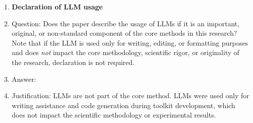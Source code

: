 \begin{enumerate}
\item {\bf Declaration of LLM usage}
    \item[] Question: Does the paper describe the usage of LLMs if it is an important, original, or non-standard component of the core methods in this research? Note that if the LLM is used only for writing, editing, or formatting purposes and does \emph{not} impact the core methodology, scientific rigor, or originality of the research, declaration is not required.
    \item[] Answer: \answerNA{}
    \item[] Justification: LLMs are not part of the core method. LLMs were used only for writing assistance and code generation during toolkit development, which does not impact the scientific methodology or experimental results.

\end{enumerate}
